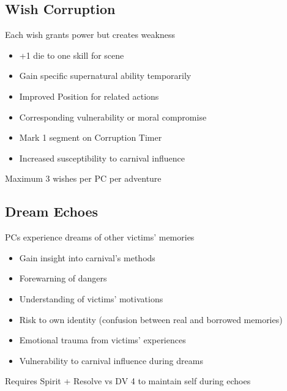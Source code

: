\documentclass[11pt]{article}
\newenvironment{mechanics}{\begin{description}[leftmargin=*,style=standard]}{\end{description}}
\begin{document}
\subsection{Wish Corruption}
\begin{mechanics}
\item[Gains:] Each wish grants power but creates weakness
\item[Effects:] 
  \begin{itemize}
    \item +1 die to one skill for scene
    \item Gain specific supernatural ability temporarily
    \item Improved Position for related actions
  \end{itemize}
\item[Corruption:] 
  \begin{itemize}
    \item Corresponding vulnerability or moral compromise
    \item Mark 1 segment on Corruption Timer 
    \item Increased susceptibility to carnival influence
  \end{itemize}
\item[Limit:] Maximum 3 wishes per PC per adventure
\end{mechanics}

\subsection{Dream Echoes}
\begin{mechanics}
\item[Manifestation:] PCs experience dreams of other victims' memories
\item[Benefits:] 
  \begin{itemize}
    \item Gain insight into carnival's methods
    \item Forewarning of dangers
    \item Understanding of victims' motivations
  \end{itemize}
\item[Risks:] 
  \begin{itemize}
    \item Risk to own identity (confusion between real and borrowed memories)
    \item Emotional trauma from victims' experiences
    \item Vulnerability to carnival influence during dreams
  \end{itemize}
\item[Control:] Requires Spirit + Resolve vs DV 4 to maintain self during echoes
\end{mechanics}
\end{document}

